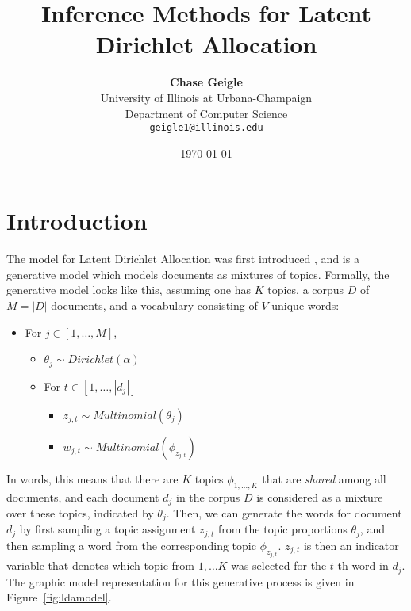 \documentclass[11pt]{article}
\begin{document}
\onehalfspacing
\title{Inference Methods for Latent Dirichlet Allocation}
\date{\today}
\author{%
    \Large{\textbf{Chase Geigle}}\\
    University of Illinois at Urbana-Champaign\\
    Department of Computer Science\\
    \texttt{geigle1@illinois.edu}
}
\maketitle


\section{Introduction}

The model for Latent Dirichlet Allocation was first introduced
\citet*{Blei:2003:LDA}, and is a generative model which models documents as
mixtures of topics. Formally, the generative model looks like this,
assuming one has $K$ topics, a corpus $D$ of $M=|D|$ documents, and a
vocabulary consisting of $V$ unique words:

\begin{itemize}
  \item For $j\in[1, \ldots, M]$,
    \begin{itemize}
      \item $\theta_j \sim Dirichlet(\alpha)$
      \item For $t \in [1,\ldots, |d_j|]$
        \begin{itemize}
          \item $z_{j,t} \sim Multinomial(\theta_j)$
          \item $w_{j,t} \sim Multinomial(\phi_{z_{j,t}})$
        \end{itemize}
    \end{itemize}
\end{itemize}

In words, this means that there are $K$ topics $\phi_{1,\ldots,K}$ that are
\emph{shared} among all documents, and each document $d_j$ in the corpus
$D$ is considered as a mixture over these topics, indicated by $\theta_j$.
Then, we can generate the words for document $d_j$ by first sampling a
topic assignment $z_{j,t}$ from the topic proportions $\theta_j$, and then
sampling a word from the corresponding topic $\phi_{z_{j,t}}$. $z_{j,t}$ is
then an indicator variable that denotes which topic from $1,\ldots K$ was
selected for the $t$-th word in $d_j$. The graphic model representation for
this generative process is given in Figure~\ref{fig:ldamodel}.
\end{document}
